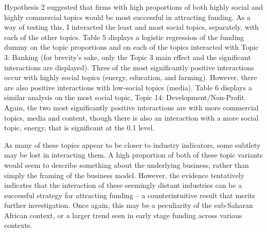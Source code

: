 \documentclass[12pt]{article}
\begin{document}
Hypothesis 2 suggested that firms with high proportions of both highly social and highly commercial topics would be most successful in attracting funding. As a way of testing this, I interacted the least and most social topics, separately, with each of the other topics. Table 5 displays a logistic regression of the funding dummy on the topic proportions and on each of the topics interacted with Topic 3: Banking (for brevity's sake, only the Topic 3 main effect and the significant interactions are displayed). Three of the most significantly positive interactions occur with highly social topics (energy, education, and farming). However, there are also positive interactions with low-social topics (media). Table 6 displays a similar analysis on the most social topic, Topic 14: Development/Non-Profit. Again, the two most significantly positive interactions are with more commercial topics, media and content, though there is also an interaction with a more social topic, energy, that is significant at the 0.1 level. 

As many of these topics appear to be closer to industry indicators, some subtlety may be lost in interacting them. A high proportion of both of these topic variants would seem to describe something about the underlying business, rather than simply the framing of the business model. However, the evidence tentatively indicates that the interaction of these seemingly distant industries can be a successful strategy for attracting funding -- a counterintuitive result that merits further investigation. Once again, this may be a peculiarity of the sub-Saharan African context, or a larger trend seen in early stage funding across various contexts. 
\end{document}
